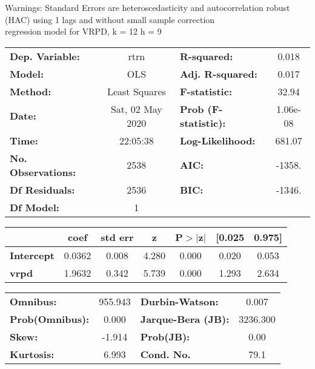 Warnings: \newline
 [1] Standard Errors are heteroscedasticity and autocorrelation robust (HAC) using 1 lags and without small sample correction\\ 

regression model for VRPD, k = 12 h = 9\begin{center}
\begin{tabular}{lclc}
\toprule
\textbf{Dep. Variable:}    &       rtrn       & \textbf{  R-squared:         } &     0.018   \\
\textbf{Model:}            &       OLS        & \textbf{  Adj. R-squared:    } &     0.017   \\
\textbf{Method:}           &  Least Squares   & \textbf{  F-statistic:       } &     32.94   \\
\textbf{Date:}             & Sat, 02 May 2020 & \textbf{  Prob (F-statistic):} &  1.06e-08   \\
\textbf{Time:}             &     22:05:38     & \textbf{  Log-Likelihood:    } &    681.07   \\
\textbf{No. Observations:} &        2538      & \textbf{  AIC:               } &    -1358.   \\
\textbf{Df Residuals:}     &        2536      & \textbf{  BIC:               } &    -1346.   \\
\textbf{Df Model:}         &           1      & \textbf{                     } &             \\
\bottomrule
\end{tabular}
\begin{tabular}{lcccccc}
                   & \textbf{coef} & \textbf{std err} & \textbf{z} & \textbf{P$> |$z$|$} & \textbf{[0.025} & \textbf{0.975]}  \\
\midrule
\textbf{Intercept} &       0.0362  &        0.008     &     4.280  &         0.000        &        0.020    &        0.053     \\
\textbf{vrpd}      &       1.9632  &        0.342     &     5.739  &         0.000        &        1.293    &        2.634     \\
\bottomrule
\end{tabular}
\begin{tabular}{lclc}
\textbf{Omnibus:}       & 955.943 & \textbf{  Durbin-Watson:     } &    0.007  \\
\textbf{Prob(Omnibus):} &   0.000 & \textbf{  Jarque-Bera (JB):  } & 3236.300  \\
\textbf{Skew:}          &  -1.914 & \textbf{  Prob(JB):          } &     0.00  \\
\textbf{Kurtosis:}      &   6.993 & \textbf{  Cond. No.          } &     79.1  \\
\bottomrule
\end{tabular}
\end{center}

